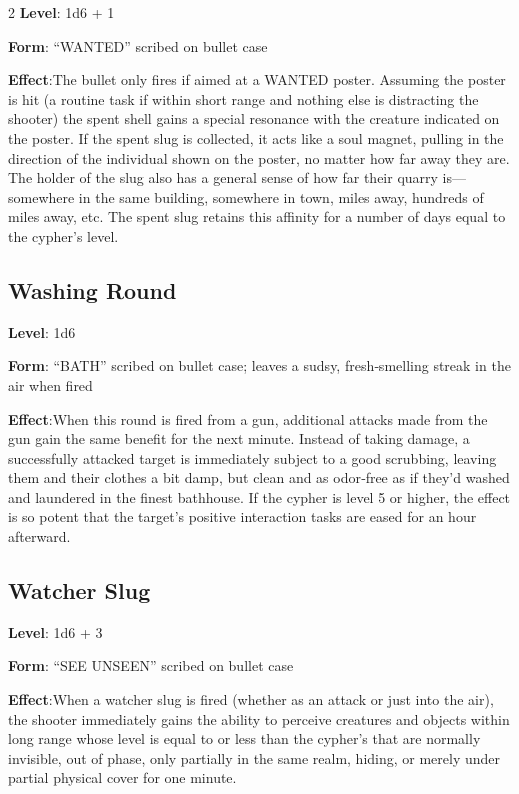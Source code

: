 \begin{multicols}{2}
\textbf{Level}: 1d6 + 1

\textbf{Form}: “WANTED” scribed on bullet case

\textbf{Effect}:The bullet only fires if aimed at a WANTED poster. Assuming the poster is hit (a routine task if within short range and nothing else is distracting the shooter) the spent shell gains a special resonance with the creature indicated on the poster. If the spent slug is collected, it acts like a soul magnet, pulling in the direction of the individual shown on the poster, no matter how far away they are. The holder of the slug also has a general sense of how far their quarry is—somewhere in the same building, somewhere in town, miles away, hundreds of miles away, etc. The spent slug retains this affinity for a number of days equal to the cypher’s level.

\subsection{Washing Round} 

\textbf{Level}: 1d6 

\textbf{Form}: “BATH” scribed on bullet case; leaves a sudsy, fresh‑smelling streak in the air when fired 

\textbf{Effect}:When this round is fired from a gun, additional attacks made from the gun gain the same benefit for the next minute. Instead of taking damage, a successfully attacked target is immediately subject to a good scrubbing, leaving them and their clothes a bit damp, but clean and as odor‑free as if they’d washed and laundered in the finest bathhouse. If the cypher is level 5 or higher, the effect is so potent that the target’s positive interaction tasks are eased for an hour afterward.

\subsection{Watcher Slug} 

\textbf{Level}: 1d6 + 3 

\textbf{Form}: “SEE UNSEEN” scribed on bullet case 

\textbf{Effect}:When a watcher slug is fired (whether as an attack or just into the air), the shooter immediately gains the ability to perceive creatures and objects within long range whose level is equal to or less than the cypher’s that are normally invisible, out of phase, only partially in the same realm, hiding, or merely under partial physical cover for one minute.


\end{multicols}
